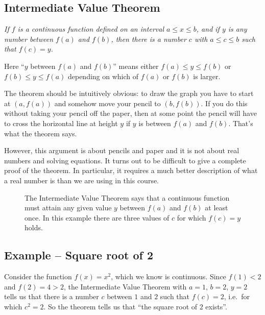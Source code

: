 \subsection{Intermediate Value Theorem} %
\itshape
If $f$ is a continuous function defined on an interval $a\leq x\leq b$, and if $y$ is
any number between $f(a)$ and $f(b)$, then there is a number $c$ with $a\leq
c\leq b$ such that $f(c) = y$.  \upshape\medskip




Here ``$y$ between $f(a)$ and $f(b)$'' means either $f(a)\leq y\leq f(b)$ or $f(b)\leq y\leq f(a)$ depending on which of $f(a)$ or $f(b)$ is larger.




The theorem should be intuitively obvious: to draw the graph you have
to start at $(a, f(a))$ and somehow move your pencil to $(b, f(b))$.
If you do this without taking your pencil off the paper, then at some
point the pencil will have to cross the horizontal line at height $y$
if $y$ is between $f(a)$ and $f(b)$.  That's what the theorem says.




However, this argument is about pencils and paper and it is not about
real numbers and solving equations.  It turns out to be difficult to
give a complete proof of the theorem.  In particular, it requires a
much better description of what a real number is than we are using in
this course.




\begin{figure}\label{fig:05intermediatevalue}
  \centering 
  \caption{The Intermediate Value Theorem says that a continuous function must
    attain any given value $y$ between $f(a)$ and $f(b)$ at least once.  In this
    example there are three values of $c$ for which $f(c) = y$ holds.}
\end{figure}




\subsection{Example -- Square root of 2} %
Consider the function $f(x) = x^2$, which we know is continuous. 
Since $f(1)<2$ and $f(2) = 4>2$, the Intermediate Value Theorem with $a=1$,
$b=2$, $y=2$ tells us that there is a number $c$ between $1$ and $2$ such that
$f(c)=2$, i.e.\ for which $c^2=2$.  So the theorem tells us that ``the square
root of $2$ exists''.




